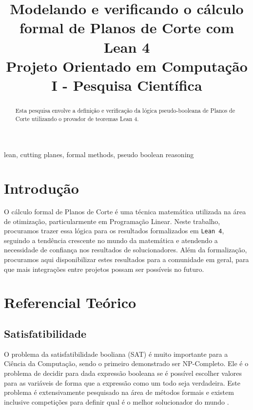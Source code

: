 \documentclass[conference]{IEEEtran}
\begin{document}
\title{Modelando e verificando o cálculo formal de Planos de Corte com Lean 4\\
{\footnotesize Projeto Orientado em Computação I - Pesquisa Científica}
}

\author{
}

\maketitle

\begin{abstract}
    Esta pesquisa envolve a definição e verificação da lógica pseudo-booleana de
    Planos de Corte utilizando o provador de teoremas Lean 4.
\end{abstract}

\begin{IEEEkeywords}
    lean, cutting planes, formal methods, pseudo boolean reasoning
\end{IEEEkeywords}

\section{Introdução}

O cálculo formal de Planos de Corte\cite{CutPlane} é uma técnica matemática utilizada na área de otimização,
particularmente em Programação Linear.
Neste trabalho, procuramos trazer essa lógica para os resultados formalizados em \texttt{Lean 4},
seguindo a tendência crescente no mundo da matemática e atendendo a necessidade de confiança
nos resultados de solucionadores. Além da formalização, procuramos aqui disponibilizar estes
resultados para a comunidade em geral, para que mais integrações entre projetos possam ser possíveis
no futuro.

\section{Referencial Teórico}

\subsection{Satisfatibilidade}
O problema da satisfatibilidade booliana (SAT) é muito importante para a Ciência da Computação, sendo o
primeiro demonstrado ser NP-Completo. Ele é o problema de decidir para dada expressão booleana
se é possível escolher valores para as variáveis de forma que a expressão como um todo seja verdadeira.
Este problema é extensivamente pesquisado na área de métodos formais\cite{SatLive} e existem inclusive competições para
definir qual é o melhor solucionador do mundo \cite{SatComp}.
\end{document}
